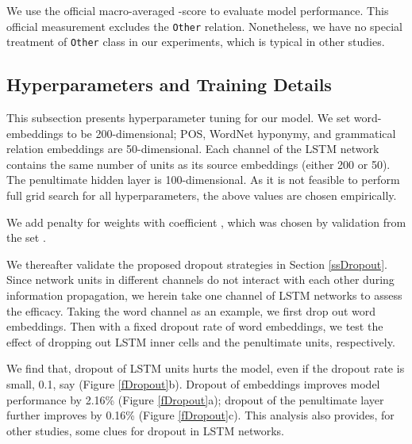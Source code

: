 \documentclass[11pt,a4paper]{article}
\begin{document}
We use the official macro-averaged -score to evaluate model performance.
This official measurement excludes the \verb|Other| relation.
Nonetheless, we have no special treatment of \verb|Other| class in our experiments,
which is typical in other studies.




\begin{figure*}[!t]
\caption{-scores versus dropout rates. 
We first evaluate the effect of dropout embeddings (a). 
Then the dropout of the inner cells (b) and the penultimate layer (c) is tested with
word embeddings being dropped out by 0.5.}
\label{fDropout}
\end{figure*}


\subsection{Hyperparameters and Training Details}\label{ssSetting}
This subsection presents hyperparameter tuning for our model.
We set word-embeddings to be 200-dimensional;
POS, WordNet hyponymy, and grammatical relation embeddings are 50-dimensional.
Each channel of the LSTM network contains the same number of units as its source embeddings
(either 200 or 50). The penultimate hidden layer is 100-dimensional.
As it is not feasible to perform full grid search for all hyperparameters,
the above values are chosen empirically.

We add  penalty for weights with coefficient ,
which was chosen by validation
from the set .

We thereafter validate the proposed dropout strategies in Section \ref{ssDropout}.
Since network units in different channels do not interact with each other during information propagation,
we herein take one channel of LSTM networks to assess the efficacy.
Taking the word channel as an example, we first drop out word embeddings.
Then with a fixed dropout rate of word embeddings,  we test the effect of dropping out LSTM inner cells
and the penultimate units, respectively.

We find that, dropout of LSTM units hurts the model,
even if the dropout rate is small, 0.1, say (Figure \ref{fDropout}b).
Dropout of embeddings improves model performance by 2.16\% (Figure \ref{fDropout}a);
dropout of the penultimate layer further improves by 0.16\% (Figure \ref{fDropout}c).
This analysis also provides, for other studies, some clues for dropout in LSTM networks.
\end{document}
